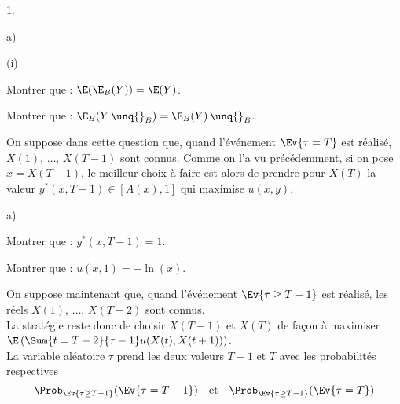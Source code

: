 \begin{noliste}{1.}
\begin{noliste}{a)}
\begin{nonoliste}{(i)}
      

      
      \item Montrer que : $\E(\E_B(Y)) = \E(Y)$.
      
      

      
      \item Montrer que : $\E_B(Y \, \unq{}_B) = \E_B(Y) \, \unq{}_B$.
      
      
    \end{nonoliste}
  \end{noliste}
    
  \item On suppose dans cette question que, quand l'événement $\Ev{\tau 
  =T}$ est réalisé, $X(1)$, $\ldots$, $X(T-1)$ sont connus. Comme on 
  l'a vu précédemment, si on pose $x=X(T-1)$, le meilleur choix à faire
  est alors de prendre pour $X(T)$ la valeur $y^*(x,T-1) \in [A(x),1]$
  qui maximise $u(x,y)$.
  \begin{noliste}{a)}
    \setlength{\itemsep}{2mm}
    \item Montrer que : $y^*(x,T-1)=1$.
    
    
    
    \item Montrer que : $u(x,1)=-\ln(x)$.
    
    
  \end{noliste}
  
  \item On suppose maintenant que, quand l'événement $\Ev{\tau \geq 
  T-1}$ est réalisé, les réels $X(1)$, $\ldots$, $X(T-2)$ sont connus. 
  \\[.1cm]
  La 
  stratégie reste donc de choisir $X(T-1)$ et $X(T)$ de façon à 
  maximiser $\E\left(\Sum{t=T-2}{\tau-1} u(X(t), 
  X(t+1))\right)$.\\[.1cm]
  La variable aléatoire $\tau$ prend les deux valeurs $T-1$ et $T$ 
  avec les probabilités respectives 
  \[
    \Prob_{\Ev{\tau \geq T-1}}(\Ev{\tau = T-1}) \quad \text{et} 
    \quad \Prob_{\Ev{\tau \geq T-1}}(\Ev{\tau = T})
  \]
  \end{noliste}
  
  
  
